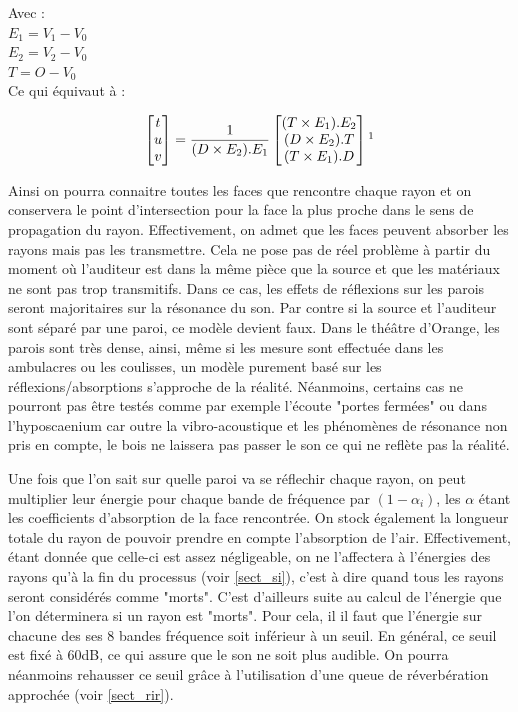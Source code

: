 Avec : \\
$E_1 =  V_1-V_0$ \\
$E_2 =  V_2-V_0$ \\
$T = O - V_0$ \\

Ce qui équivaut à : 

\begin{equation}
	\begin{bmatrix}
 	 t \\
	 u \\
	 v
	\end{bmatrix}
	=
	\frac{1}{
 	  (D \times E_2).E_1
	}
	\begin{bmatrix}
 		  (T \times E_1).E_2
 \\ 
 		  (D \times E_2).T
 \\
 		  (T \times E_1).D
	\end{bmatrix}	
	\footnotemark
\end{equation}

Ainsi on pourra connaitre toutes les faces que rencontre chaque rayon et on conservera le point d'intersection pour la face la plus proche dans le sens de propagation du rayon. Effectivement, on admet que les faces peuvent absorber les rayons mais pas les transmettre. Cela ne pose pas de réel problème à partir du moment où l'auditeur est dans la même pièce que la source et que les matériaux ne sont pas trop transmitifs. Dans ce cas, les effets de réflexions sur les parois seront majoritaires sur la résonance du son. Par contre si la source et l'auditeur sont séparé par une paroi, ce modèle devient faux. Dans le théâtre d'Orange, les parois sont très dense, ainsi, même si les mesure sont effectuée dans les \glspl{ambulacre} ou les coulisses, un modèle purement basé sur les réflexions/absorptions s'approche de la réalité. Néanmoins, certains cas ne pourront pas être testés comme par exemple l'écoute "portes fermées" ou dans l'\gls{hyposcaenium} car outre la vibro-acoustique et les phénomènes de résonance non pris en compte, le bois ne laissera pas passer le son ce qui ne reflète pas la réalité.

Une fois que l'on sait sur quelle paroi va se réflechir chaque rayon, on peut multiplier leur énergie pour chaque bande de fréquence par $(1-\alpha_i)$, les $\alpha$ étant les coefficients d'absorption de la face rencontrée. On stock également la longueur totale du rayon de pouvoir prendre en compte l'absorption de l'air. Effectivement, étant donnée que celle-ci est assez négligeable, on ne l'affectera à l'énergies des rayons qu'à la fin du processus (voir \ref{sect_si}), c'est à dire quand tous les rayons seront considérés comme "morts". C'est d'ailleurs suite au calcul de l'énergie que l'on déterminera si un rayon est "morts". Pour cela, il il faut que l'énergie sur chacune des ses 8 bandes fréquence soit inférieur à un seuil. En général, ce seuil est fixé à 60dB, ce qui assure que le son ne soit plus audible. On pourra néanmoins rehausser ce seuil grâce à l'utilisation d'une queue de réverbération approchée (voir \ref{sect_rir}).

